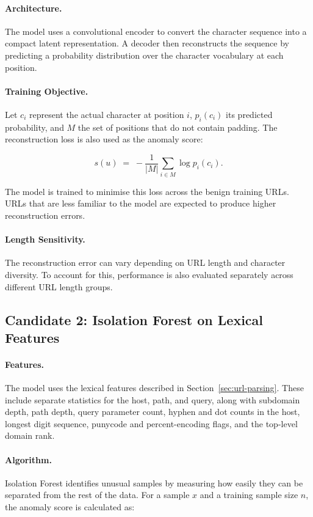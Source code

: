\documentclass{FastFyp}
\begin{document}
\paragraph{Architecture.} The model uses a convolutional encoder to convert the character sequence into a compact latent representation. A decoder then reconstructs the sequence by predicting a probability distribution over the character vocabulary at each position.

\paragraph{Training Objective.} Let $c_i$ represent the actual character at position $i$, $p_i(c_i)$ its predicted probability, and $M$ the set of positions that do not contain padding. The reconstruction loss is also used as the anomaly score:

\begin{equation}
s(u) \;=\; -\frac{1}{|M|}\sum_{i\in M} \log p_i(c_i).
\end{equation}

The model is trained to minimise this loss across the benign training URLs. URLs that are less familiar to the model are expected to produce higher reconstruction errors.

\paragraph{Length Sensitivity.} The reconstruction error can vary depending on URL length and character diversity. To account for this, performance is also evaluated separately across different URL length groups.

\subsection{Candidate 2: Isolation Forest on Lexical Features}

\paragraph{Features.} The model uses the lexical features described in Section~\ref{sec:url-parsing}. These include separate statistics for the host, path, and query, along with subdomain depth, path depth, query parameter count, hyphen and dot counts in the host, longest digit sequence, punycode and percent-encoding flags, and the top-level domain rank.

\paragraph{Algorithm.} Isolation Forest identifies unusual samples by measuring how easily they can be separated from the rest of the data. For a sample $x$ and a training sample size $n$, the anomaly score is calculated as:
\end{document}
